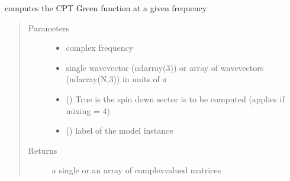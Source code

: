 \documentclass[letterpaper,10pt,english]{sphinxmanual}
\begin{document}
\begin{fulllineitems}
\label{\detokenize{functions:pyqcm.CPT_Green_function}}
\sphinxAtStartPar
computes the CPT Green function at a given frequency
\begin{quote}\begin{description}
\item[{Parameters}] \leavevmode\begin{itemize}
\item {} 
\sphinxAtStartPar
{} \textendash{} complex frequency

\item {} 
\sphinxAtStartPar
{} \textendash{} single wavevector (ndarray(3)) or array of wavevectors (ndarray(N,3)) in units of \(\pi\)

\item {} 
\sphinxAtStartPar
{} () \textendash{} True is the spin down sector is to be computed (applies if mixing = 4)

\item {} 
\sphinxAtStartPar
{} () \textendash{} label of the model instance

\end{itemize}

\item[{Returns}] \leavevmode
\sphinxAtStartPar
a single or an array of complex\sphinxhyphen{}valued matrices

\end{description}\end{quote}

\end{fulllineitems}

\end{document}
